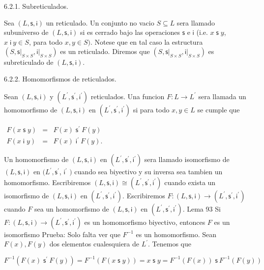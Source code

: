6.2.1. Subreticulados.

Sea \((L,\mathsf{s},\mathsf{i})\) un reticulado. Un conjunto no vacio \( S\subseteq L\) sera llamado subuniverso de \((L,\mathsf{s},\mathsf{i} ) \) si es cerrado bajo las operaciones \(\mathsf{s}\) e \(\mathsf{i}\) (i.e. \(x \mathsf{\;s\;}y\), \(x\;\mathsf{i}\ y\in S\), para todo \(x,y\in S)\). Notese que en tal caso la estructura \((S,\mathsf{s}\mathrm{\mid }_{S\times S},\mathsf{i} \mathrm{\mid }_{S\times S})\) es un reticulado. Diremos que \((S,\mathsf{s} \mathrm{\mid }_{S\times S},\mathsf{i}\mathrm{\mid }_{S\times S})\) es subreticulado de \((L,\mathsf{s},\mathsf{i})\).

6.2.2. Homomorfismos de reticulados.

Sean \((L,\mathsf{s},\mathsf{i})\) y \((L^{\prime },\mathsf{s}^{\prime }, \mathsf{i}^{\prime })\) reticulados. Una funcion \(F:L\rightarrow L^{\prime }\) sera llamada un homomorfismo de \((L,\mathsf{s},\mathsf{i})\) en \((L^{\prime },\mathsf{s}^{\prime },\mathsf{i}^{\prime })\) si para todo \( x,y\in L\) se cumple que

\(\displaystyle \begin{array}{rcl} F(x\mathsf{\;s\;}y) & =& F(x)\;\mathsf{s}^{\prime }\ F(y) \\ F(x\mathsf{\;i\;}y) & =& F(x)\;\mathsf{i}^{\prime }\ F(y). \end{array} \)

Un homomorfismo de \((L,\mathsf{s},\mathsf{i})\) en \((L^{\prime }, \mathsf{s}^{\prime },\mathsf{i}^{\prime })\) sera llamado isomorfismo de \((L,\mathsf{s},\mathsf{i})\) en \((L^{\prime },\mathsf{s}^{\prime }\), \(\mathsf{i}^{\prime }\) \()\) cuando sea biyectivo y su inversa sea tambien un homomorfismo. Escribiremos \((L,\mathsf{s},\mathsf{i})\cong (L^{\prime }, \mathsf{s}^{\prime },\mathsf{i}^{\prime })\) cuando exista un isomorfismo de \( (L,\mathsf{s},\mathsf{i})\) en \((L^{\prime },\mathsf{s}^{\prime },\mathsf{i} ^{\prime })\). Escribiremos \(F:(L,\mathsf{s},\mathsf{i})\rightarrow (L^{\prime },\mathsf{s}^{\prime },\mathsf{i}^{\prime })\) cuando \(F\) sea un homomorfismo de \((L,\mathsf{s},\mathsf{i})\) en \((L^{\prime }, \mathsf{s}^{\prime },\mathsf{i}^{\prime })\).
Lema 93 Si \(F:(L,\mathsf{s},\mathsf{i})\rightarrow (L^{\prime },\mathsf{s}^{\prime },\mathsf{i}^{\prime })\) es un homomorfismo biyectivo, entonces \(F\) es un isomorfismo
Prueba: Solo falta ver que \(F^{-1}\) es un homomorfismo. Sean \(F(x),F(y)\) dos elementos cualesquiera de \(L^{\prime }\). Tenemos que

\(\displaystyle F^{-1}(F(x)\;\mathsf{s}^{\prime }\ F(y))=F^{-1}(F(x\mathsf{\;s\;}y))=x \mathsf{\;s\;}y=F^{-1}(F(x))\;\mathsf{s}\ F^{-1}(F(y)) \)

